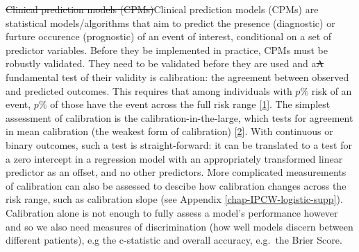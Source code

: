 \documentclass[
]{article}
\begin{document}
\sout{Clinical prediction models (CPMs)}Clinical prediction models (CPMs) are statistical models/algorithms that aim to predict the presence (diagnostic) or furture occurence (prognostic) of an event of interest, conditional on a set of predictor variables. Before they be implemented in practice, CPMs must be robustly validated. They need to be validated before they are used and a\sout{A} fundamental test of their validity is calibration: the agreement between observed and predicted outcomes. This requires that among individuals with \(p\%\) risk of an event, \(p\%\) of those have the event across the full risk range {[}\protect\hyperlink{ref-steyerberg_clinical_2008}{1}{]}. The simplest assessment of calibration is the calibration-in-the-large, which tests for agreement in mean calibration (the weakest form of calibration) {[}\protect\hyperlink{ref-calster_calibration_2016-1}{2}{]}. With continuous or binary outcomes, such a test is straight-forward: it can be translated to a test for a zero intercept in a regression model with an appropriately transformed linear predictor as an offset, and no other predictors. More complicated measurements of calibration can also be assessed to descibe how calibration changes across the risk range, such as calibration slope (see Appendix \ref{chap-IPCW-logistic-supp}). Calibration alone is not enough to fully assess a model's performance however and so we also need measures of discrimination (how well models discern between different patients), e.g the c-statistic and overall accuracy, e.g.~the Brier Score.
\end{document}
